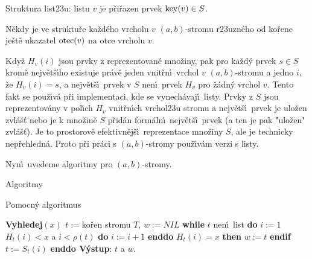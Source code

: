 \flushpar Struktura list\accent23u:\newline 
listu $v$ je p\v ri\v razen prvek $\operatorname{key}(v)\in S$.
\medskip

\flushpar N\v ekdy je ve struktu\v re ka\v zd\'eho vrcholu $v$ 
$(a,b)$-stromu r\accent23uzn\'eho od ko\v rene je\v st\v e ukazatel 
$\operatorname{otec}(v)$ na otce vrcholu $v$.
\medskip

\flushpar Kdy\v z $H_v(i)$ jsou prvky z reprezentovan\'e 
mno\v ziny, pak pro ka\v zd\'y prvek $s\in S$ krom\v e nejv\v et\v s\'\i ho 
existuje pr\'av\v e jeden vnit\v r\-n\'\i\ vrchol $v$ $(a,b)$-stromu 
a jedno $i$, \v ze $H_v(i)=s$, a nejv\v et\v s\'\i\ prvek v $S$ nen\'\i\ prvek 
$H_v$ pro \v z\'adn\'y vrchol $v$. Tento fakt se pou\v z\'\i v\'a p\v ri 
implementaci, kde se vynech\'avaj\'\i\ listy. Prvky z $S$ jsou 
reprezentov\'any v pol\'\i ch $H_v$ vnit\v r\-n\'\i ch vrchol\accent23u 
stromu 
a nejv\v et\v s\'\i\ prvek je ulo\v zen zvl\'a\v s\v t nebo je k mno\v zin\v e $S$ p\v rid\'an 
form\'aln\'\i\ nejv\v et\v s\'\i\ prvek (a ten je pak "ulo\v zen" zvl\'a\v s\v t). Je to prostorov\v e 
efektivn\v ej\v s\'\i\ reprezentace mno\v ziny $S$, ale je technicky 
nep\v rehledn\'a. Proto p\v ri pr\'aci s $(a,b)$-stromy pou\v z\'\i v\'am 
verzi s listy.
\medskip

\flushpar Nyn\'\i\ uvedeme algoritmy pro $(a,b)$-stromy.

\subhead 
Algoritmy
\endsubhead

\flushpar Pomocn\'y algoritmus
\bigskip

{\bf Vyhledej$(x)$\newline 
$t:=$}ko\v ren stromu $T$, $w:=NIL$\newline 
{\bf while} $t$ nen\'\i\ list {\bf do}\newline 
\phantom{---}$i:=1$\newline 
\phantom{---}{\bf while} $H_t(i)<x$ a $i<\rho (t)$ {\bf do} $i:=i+1$ {\bf enddo}\newline 
\phantom{---}{\bf if} $H_t(i)=x$ {\bf then} $w:=t$ {\bf endif}\newline 
$t:=S_t(i)$ {\bf enddo V\'ystup}: $t$ a $w$.
\medskip


